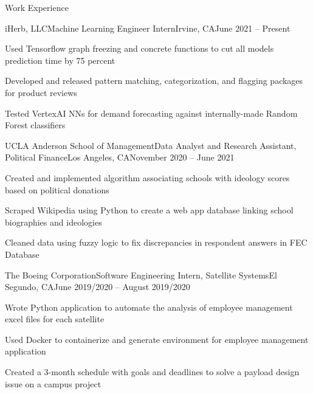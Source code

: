 \documentclass{article}
\newlength{\tabin}
\newlength{\secsep}
\newcommand{\lineunder}{\vspace*{-8pt} \\ \hspace*{-6pt} \hrulefill \\ \vspace*{-15pt}}
\newenvironment{tabbedsection}[1]{
  \begin{list}{}{
      \setlength{\itemsep}{0pt}
      \setlength{\labelsep}{0pt}
      \setlength{\labelwidth}{0pt}
      \setlength{\leftmargin}{\tabin}
      \setlength{\rightmargin}{\tabin}
      \setlength{\listparindent}{0pt}
      \setlength{\parsep}{0pt}
      \setlength{\parskip}{0pt}
      \setlength{\partopsep}{0pt}
      \setlength{\topsep}{#1}
    }
  \item[]
}{\end{list}}
\newenvironment{resume_section}[1]{
  \filbreak
  \vspace{2\secsep}
  \textsc{\large#1}
  \lineunder
  \begin{tabbedsection}{\secsep}
}{\end{tabbedsection}}
\newenvironment{subitems}{
  \renewcommand{\labelitemi}{-}
  \begin{itemize}
      \setlength{\labelsep}{1em}
}{\end{itemize}}
\newenvironment{resume_employer}[4]{
  \vspace{\secsep}
  \textbf{#1} \hfill{\footnotesize#3} \\
  \indent {\small #2} \hfill{\footnotesize(#4)} \par
  \begin{tabbedsection}{0pt}
  \begin{subitems}
}{\end{subitems}\end{tabbedsection}}
\begin{document}
\begin{resume_section}{Work Experience}
\begin{resume_employer}{iHerb, LLC}{Machine Learning Engineer Intern}{Irvine, CA}{June 2021 -- Present}
  \item Used Tensorflow graph freezing and concrete functions to cut all models prediction time by 75 percent
  \item Developed and released pattern matching, categorization, and flagging packages for product reviews
  \item Tested VertexAI NNs for demand forecasting against internally-made Random Forest classifiers
  \end{resume_employer}
  
  \begin{resume_employer}{UCLA Anderson School of Management}{Data Analyst and Research Assistant, Political Finance}{Los Angeles, CA}{November 2020 -- June 2021}
    \item Created and implemented algorithm associating schools with ideology scores based on political donations
    \item Scraped Wikipedia using Python to create  a web app database linking school biographies and ideologies
    \item Cleaned data using fuzzy logic to fix discrepancies in respondent answers in FEC Database 
  \end{resume_employer}
  
  \begin{resume_employer}{The Boeing Corporation}{Software Engineering Intern, Satellite Systems}{El Segundo, CA}{June 2019/2020 -- August 2019/2020}
    \item Wrote Python application to automate the analysis of employee management excel files for each satellite 
    \item Used Docker to containerize and generate environment for employee management application
    \item Created a 3-month schedule with goals and deadlines to solve a payload design issue on a campus project
  \end{resume_employer}
\end{resume_section}
\end{document}
